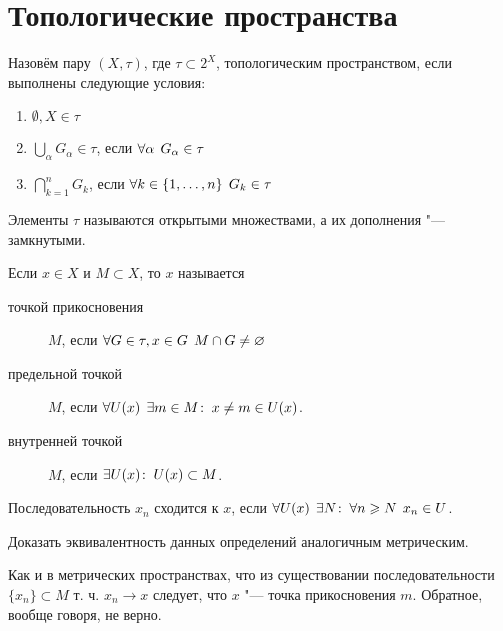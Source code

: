 \documentclass[main]{subfiles}
\begin{document}
\section{Топологические пространства}

\begin{definition}
  Назовём пару \( (X, \tau) \), где \( \tau \subset 2^X \),
  топологическим пространством, если выполнены следующие
  условия:
  \begin{enumerate}
    \item \( \emptyset, X \in \tau \)
    \item \( \bigcup_\alpha G_\alpha \in \tau \), если
      \( \forall {\alpha} \; \, G_\alpha \in \tau \)
    \item \( \bigcap_{k = 1}^n G_k \), если
      \( \forall {k \in \{ 1, \dots, n \}} \; \, G_k \in \tau \)
  \end{enumerate}
  Элементы \( \tau \) называются открытыми множествами,
  а их дополнения "--- замкнутыми.
\end{definition}

\begin{definition}
  Если \( x \in X \) и \( M \subset X \), то \( x \)
  называется
  \begin{description}
    \item[точкой прикосновения] \( M \), если
      \( \forall {G \in \tau, x \in G} \; \, M \cap G \ne \varnothing \)
    \item[предельной точкой] \( M \), если
      \( \forall {U(x)} \; \, \exists m \in M \colon \: x \ne m \in U(x) \).
    \item[внутренней точкой] \( M \), если
      \( \exists U(x) \colon \: U(x) \subset M \).
  \end{description}
\end{definition}

\begin{definition}
  Последовательность \( x_n \) сходится к \( x \), если
  \( \forall {U(x)} \; \, \exists N \colon \: \forall {n \geqslant N} \; \, x_n \in U \).
\end{definition}

\begin{exercise}
  Доказать эквивалентность данных определений аналогичным
  метрическим.
\end{exercise}

\begin{remark}
  Как и в метрических пространствах,
  что из существовании последовательности
  \( \{ x_n \} \subset M \) т. ч. \( x_n \to x \)
  следует, что \( x \) "--- точка прикосновения \( m \).
  Обратное, вообще говоря, не верно.
\end{remark}
\end{document}
